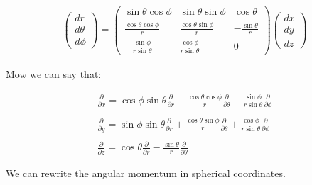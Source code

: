 \begin{equation}
  \begin{array}{c}
    \left(\begin{matrix}
      dr\\
      d\theta\\
      d\phi
    \end{matrix}
    \right) =
    \left(\begin{matrix}
      \sin{\theta}\cos{\phi} & \sin{\theta}\sin{\phi} & \cos{\theta} \\
      \frac{\cos{\theta}\cos{\phi}}{r} & \frac{\cos{\theta}\sin{\phi}}{r} & -\frac{\sin{\theta}}{r} \\
      -\frac{\sin{\phi}}{r\sin{\theta}} & \frac{\cos{\phi}}{r\sin{\theta}} & 0
    \end{matrix}\right)
    \left(\begin{matrix}
      dx\\
      dy\\
      dz
    \end{matrix}\right)
  \end{array}
\end{equation}

Mow we can say that:

\begin{equation}
  \begin{array}{c}
    \frac{\partial}{\partial x} = \cos{\phi}\sin{\theta}\frac{\partial}{\partial r} + \frac{\cos{\theta}\cos{\phi}}{r} \frac{\partial}{\partial \theta} - \frac{\sin{\phi}}{r\sin{\theta}} \frac{\partial}{\partial \phi}
    \\

    \\
    \frac{\partial}{\partial y} = \sin{\phi}\sin{\theta}\frac{\partial}{\partial r} + \frac{\cos{\theta}\sin{\phi}}{r} \frac{\partial}{\partial \theta} + \frac{\cos{\phi}}{r\sin{\theta}} \frac{\partial}{\partial \phi}
    \\

    \\
    \frac{\partial}{\partial z} = \cos{\theta}\frac{\partial}{\partial r} - \frac{\sin{\theta}}{r} \frac{\partial}{\partial \theta}
  \end{array}
\end{equation}

We can rewrite the angular momentum in spherical coordinates.

